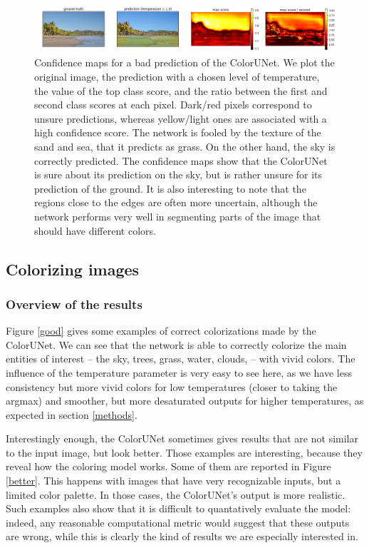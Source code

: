 \documentclass[10pt,twocolumn,letterpaper]{article}
\begin{document}
\begin{figure}
\begin{center}
\includegraphics[width=450px]{confidence}
\caption{Confidence maps for a bad prediction of the ColorUNet. We plot the original image, the prediction with a chosen level of temperature, the value of the top class score, and the ratio between the first and second class scores at each pixel. Dark/red pixels correspond to unsure predictions, whereas yellow/light ones are associated with a high confidence score. The network is fooled by the texture of the sand and sea, that it predicts as grass. On the other hand, the sky is correctly predicted. The confidence maps show that the ColorUNet is sure about its prediction on the sky, but is rather unsure for its prediction of the ground. It is also interesting to note that the regions close to the edges are often more uncertain, although the network performs very well in segmenting parts of the image that should have different colors.}
\label{confidence}
\end{center}
\end{figure}
\subsection{Colorizing images}
\subsubsection{Overview of the results}

Figure \ref{good} gives some examples of correct colorizations made by the ColorUNet. We can see that the network is able to correctly colorize the main entities of interest -- the sky, trees, grass, water, clouds, \etc --  with vivid colors. The influence of the temperature parameter is very easy to see here, as we have less consistency but more vivid colors for low temperatures (closer to taking the argmax) and smoother, but more desaturated outputs for higher temperatures, as expected in section \ref{methods}.

Interestingly enough, the ColorUNet sometimes gives results that are not similar to the input image, but look better. Those examples are interesting, because they reveal how the coloring model works. Some of them are reported in Figure \ref{better}. This happens with images that have very recognizable inputs, but a limited color palette. In those cases, the ColorUNet's output is more realistic.
Such examples also show that it is difficult to quantatively evaluate the model: indeed, any reasonable computational metric would suggest that these outputs are wrong, while this is clearly the kind of results we are especially interested in.
\end{document}
